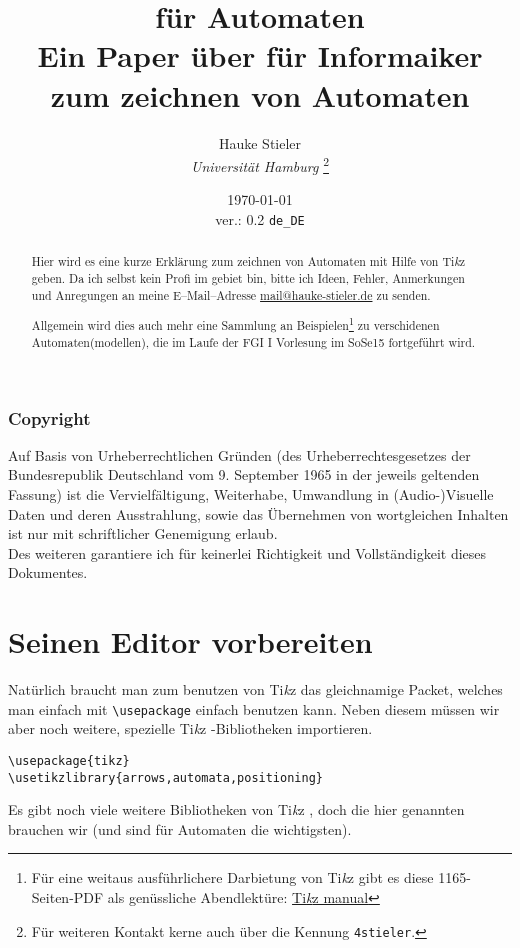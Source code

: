 \documentclass{article}
\author{Hauke Stieler\\\vspace{10pt}\small\textit{Universität Hamburg} \thanks{Für weiteren Kontakt kerne auch über die Kennung \texttt{4stieler}.}}
\title{\Huge{\logo für Automaten}\\\vspace{10pt}\large{Ein Paper über \logo für Informaiker zum zeichnen von Automaten}}
\date{\today\\\small{ver.: 0.2 \texttt{de\_DE}}}
\newcommand{\logo}{Ti\textit{k}z }
\begin{document}
	\maketitle
	\begin{abstract}
		Hier wird es eine kurze Erklärung zum zeichnen von Automaten mit Hilfe von \logo geben. Da ich selbst kein Profi im gebiet bin, bitte ich Ideen, Fehler, Anmerkungen und Anregungen an meine E--Mail--Adresse \href{mailto:mail@hauke-stieler.de}{mail@hauke-stieler.de} zu senden.
		
		Allgemein wird dies auch mehr eine Sammlung an Beispielen\footnote[2]{Für eine weitaus ausführlichere Darbietung von \logo gibt es diese 1165-Seiten-PDF als genüssliche Abendlektüre: \href{http://ftp.fau.de/ctan/graphics/pgf/base/doc/pgfmanual.pdf}{\logo manual}} zu verschidenen Automaten(modellen), die im Laufe der FGI I Vorlesung im SoSe15 fortgeführt wird.
	\end{abstract}\newpage
	\tableofcontents
	\vfill
	\subsubsection*{Copyright}
	Auf Basis von Urheberrechtlichen Gründen (des Urheberrechtesgesetzes der Bundesrepublik Deutschland vom 9. September 1965 in der jeweils geltenden Fassung) ist die Vervielfältigung, Weiterhabe, Umwandlung in (Audio-)Visuelle Daten und deren Ausstrahlung, sowie das Übernehmen von wortgleichen Inhalten ist nur mit schriftlicher Genemigung erlaub.\\
	Des weiteren garantiere ich für keinerlei Richtigkeit und Vollständigkeit dieses Dokumentes.
	\newpage
	\section{Seinen Editor vorbereiten}
	Natürlich braucht man zum benutzen von \logo das gleichnamige Packet, welches man einfach mit \texttt{\textbackslash usepackage} einfach benutzen kann. Neben diesem müssen wir aber noch weitere, spezielle \logo -Bibliotheken importieren.\\
	\begin{minipage}{\linewidth}
		\begin{lstlisting}[caption={Alle Pakete, die wir benutzen (möchten).}]
\usepackage{tikz}
\usetikzlibrary{arrows,automata,positioning}
		\end{lstlisting}
	\end{minipage}
	Es gibt noch viele weitere Bibliotheken von \logo, doch die hier genannten brauchen wir (und sind für Automaten die wichtigsten).
\end{document}
